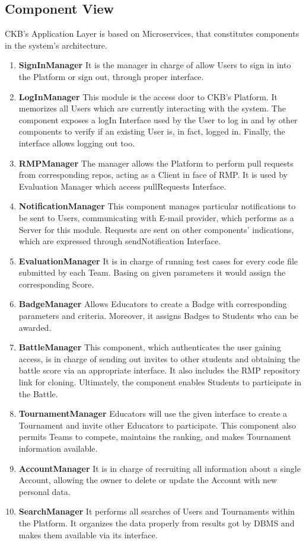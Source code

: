 \subsection{Component View}
CKB's Application Layer is based on Microservices, that constitutes components in the system's architecture.
\begin{enumerate}
    \item \textbf{SignInManager} It is the manager in charge of allow Users to sign in into the Platform or sign out, through proper interface.
    \item \textbf{LogInManager} This module is the access door to CKB's Platform. It memorizes all Users which are currently interacting with the system. The component exposes a logIn Interface used by the User to log in 
    and by other components to verify if an existing User is, in fact, logged in. Finally, the interface allows logging out too.
    \item \textbf{RMPManager} The manager allows the Platform to perform pull requests from corresponding repos, acting as a Client in face of RMP. It is used by Evaluation Manager which access pullRequests Interface.
    \item \textbf{NotificationManager} This component manages particular notifications to be sent to Users, communicating with E-mail provider, which performs as a Server for this module. Requests are sent on other 
    components' indications, which are expressed through sendNotification Interface.
    \item \textbf{EvaluationManager} It is in charge of running test cases for every code file submitted by each Team. Basing on given parameters it would assign the corresponding Score.
    \item \textbf{BadgeManager} Allows Educators to create a Badge with corresponding parameters and criteria. Moreover, it assigns Badges to Students who can be awarded.
    \item \textbf{BattleManager} This component, which authenticates the user gaining access, is in charge of sending out invites to other students and obtaining the battle score via an appropriate interface. It also 
    includes the RMP repository link for cloning. Ultimately, the component enables Students to participate in the Battle.
    \item \textbf{TournamentManager} Educators will use the given interface to create a Tournament and invite other Educators to participate. This component also permits Teams to compete, maintains the ranking, and makes
    Tournament information available.
    \item \textbf{AccountManager} It is in charge of recruiting all information about a single Account, allowing the owner to delete or update the Account with new personal data.
    \item \textbf{SearchManager} It performs all searches of Users and Tournaments within the Platform. It organizes the data properly from results got by DBMS and makes them available via its interface.
\end{enumerate}

